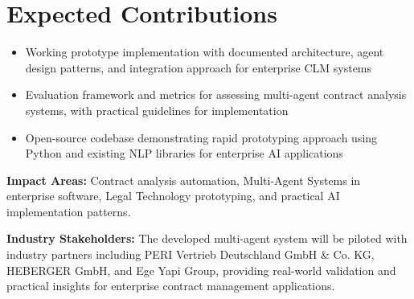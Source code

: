 
\section{Expected Contributions}\label{section:expected_contributions}


\begin{itemize}
    \item Working prototype implementation with documented architecture, agent design patterns, and integration approach for enterprise CLM systems
    \item Evaluation framework and metrics for assessing multi-agent contract analysis systems, with practical guidelines for implementation
    \item Open-source codebase demonstrating rapid prototyping approach using Python and existing NLP libraries for enterprise AI applications
\end{itemize}

\textbf{Impact Areas:} Contract analysis automation, Multi-Agent Systems in enterprise software, Legal Technology prototyping, and practical AI implementation patterns.

\textbf{Industry Stakeholders:} The developed multi-agent system will be piloted with industry partners including PERI Vertrieb Deutschland GmbH \& Co. KG, HEBERGER GmbH, and Ege Yapi Group, providing real-world validation and practical insights for enterprise contract management applications.
